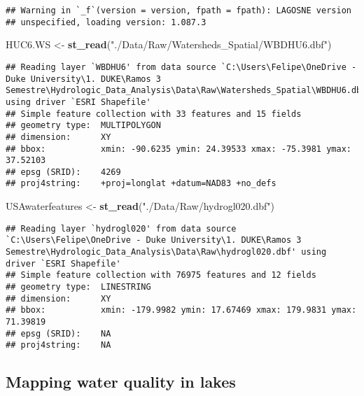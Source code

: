 \documentclass[]{article}
\newenvironment{Shaded}{\begin{snugshade}}{\end{snugshade}}
\newcommand{\KeywordTok}[1]{\textcolor[rgb]{0.13,0.29,0.53}{\textbf{#1}}}
\newcommand{\NormalTok}[1]{#1}
\newcommand{\StringTok}[1]{\textcolor[rgb]{0.31,0.60,0.02}{#1}}
\begin{document}
\begin{verbatim}
## Warning in `_f`(version = version, fpath = fpath): LAGOSNE version
## unspecified, loading version: 1.087.3
\end{verbatim}

\begin{Shaded}
\begin{Highlighting}[]
\NormalTok{HUC6.WS <-}\StringTok{ }\KeywordTok{st_read}\NormalTok{(}\StringTok{"./Data/Raw/Watersheds_Spatial/WBDHU6.dbf"}\NormalTok{)}
\end{Highlighting}
\end{Shaded}

\begin{verbatim}
## Reading layer `WBDHU6' from data source `C:\Users\Felipe\OneDrive - Duke University\1. DUKE\Ramos 3 Semestre\Hydrologic_Data_Analysis\Data\Raw\Watersheds_Spatial\WBDHU6.dbf' using driver `ESRI Shapefile'
## Simple feature collection with 33 features and 15 fields
## geometry type:  MULTIPOLYGON
## dimension:      XY
## bbox:           xmin: -90.6235 ymin: 24.39533 xmax: -75.3981 ymax: 37.52103
## epsg (SRID):    4269
## proj4string:    +proj=longlat +datum=NAD83 +no_defs
\end{verbatim}

\begin{Shaded}
\begin{Highlighting}[]
\NormalTok{USAwaterfeatures <-}\StringTok{ }\KeywordTok{st_read}\NormalTok{(}\StringTok{"./Data/Raw/hydrogl020.dbf"}\NormalTok{)}
\end{Highlighting}
\end{Shaded}

\begin{verbatim}
## Reading layer `hydrogl020' from data source `C:\Users\Felipe\OneDrive - Duke University\1. DUKE\Ramos 3 Semestre\Hydrologic_Data_Analysis\Data\Raw\hydrogl020.dbf' using driver `ESRI Shapefile'
## Simple feature collection with 76975 features and 12 fields
## geometry type:  LINESTRING
## dimension:      XY
## bbox:           xmin: -179.9982 ymin: 17.67469 xmax: 179.9831 ymax: 71.39819
## epsg (SRID):    NA
## proj4string:    NA
\end{verbatim}

\hypertarget{mapping-water-quality-in-lakes}{%
\subsection{Mapping water quality in
lakes}\label{mapping-water-quality-in-lakes}}
\end{document}

